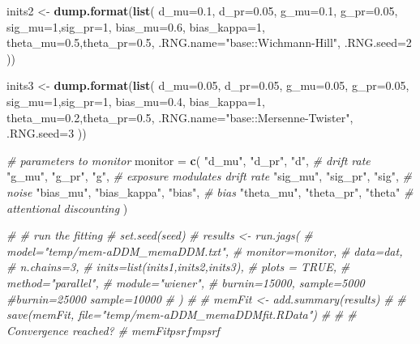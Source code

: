 \documentclass[
]{book}
\newenvironment{Shaded}{\begin{snugshade}}{\end{snugshade}}
\newcommand{\AttributeTok}[1]{\textcolor[rgb]{0.13,0.29,0.53}{#1}}
\newcommand{\CommentTok}[1]{\textcolor[rgb]{0.56,0.35,0.01}{\textit{#1}}}
\newcommand{\DecValTok}[1]{\textcolor[rgb]{0.00,0.00,0.81}{#1}}
\newcommand{\FloatTok}[1]{\textcolor[rgb]{0.00,0.00,0.81}{#1}}
\newcommand{\FunctionTok}[1]{\textcolor[rgb]{0.13,0.29,0.53}{\textbf{#1}}}
\newcommand{\NormalTok}[1]{#1}
\newcommand{\OtherTok}[1]{\textcolor[rgb]{0.56,0.35,0.01}{#1}}
\newcommand{\StringTok}[1]{\textcolor[rgb]{0.31,0.60,0.02}{#1}}
\begin{document}
\begin{Shaded}
\begin{Highlighting}[]
\NormalTok{inits2 }\OtherTok{\textless{}{-}} \FunctionTok{dump.format}\NormalTok{(}\FunctionTok{list}\NormalTok{( }
  \AttributeTok{d\_mu=}\FloatTok{0.1}\NormalTok{, }\AttributeTok{d\_pr=}\FloatTok{0.05}\NormalTok{,}
  \AttributeTok{g\_mu=}\FloatTok{0.1}\NormalTok{, }\AttributeTok{g\_pr=}\FloatTok{0.05}\NormalTok{,}
  \AttributeTok{sig\_mu=}\DecValTok{1}\NormalTok{,}\AttributeTok{sig\_pr=}\DecValTok{1}\NormalTok{,}
  \AttributeTok{bias\_mu=}\FloatTok{0.6}\NormalTok{, }\AttributeTok{bias\_kappa=}\DecValTok{1}\NormalTok{,}
  \AttributeTok{theta\_mu=}\FloatTok{0.5}\NormalTok{,}\AttributeTok{theta\_pr=}\FloatTok{0.5}\NormalTok{,}
  \AttributeTok{.RNG.name=}\StringTok{"base::Wichmann{-}Hill"}\NormalTok{, }\AttributeTok{.RNG.seed=}\DecValTok{2}
\NormalTok{))}

\NormalTok{inits3 }\OtherTok{\textless{}{-}} \FunctionTok{dump.format}\NormalTok{(}\FunctionTok{list}\NormalTok{( }
  \AttributeTok{d\_mu=}\FloatTok{0.05}\NormalTok{, }\AttributeTok{d\_pr=}\FloatTok{0.05}\NormalTok{,}
  \AttributeTok{g\_mu=}\FloatTok{0.05}\NormalTok{, }\AttributeTok{g\_pr=}\FloatTok{0.05}\NormalTok{,}
  \AttributeTok{sig\_mu=}\DecValTok{1}\NormalTok{,}\AttributeTok{sig\_pr=}\DecValTok{1}\NormalTok{,}
  \AttributeTok{bias\_mu=}\FloatTok{0.4}\NormalTok{, }\AttributeTok{bias\_kappa=}\DecValTok{1}\NormalTok{,}
  \AttributeTok{theta\_mu=}\FloatTok{0.2}\NormalTok{,}\AttributeTok{theta\_pr=}\FloatTok{0.5}\NormalTok{,}
  \AttributeTok{.RNG.name=}\StringTok{"base::Mersenne{-}Twister"}\NormalTok{, }\AttributeTok{.RNG.seed=}\DecValTok{3}
\NormalTok{))}

\CommentTok{\# parameters to monitor}
\NormalTok{monitor }\OtherTok{=} \FunctionTok{c}\NormalTok{(}
  \StringTok{"d\_mu"}\NormalTok{, }\StringTok{"d\_pr"}\NormalTok{, }\StringTok{"d"}\NormalTok{, }\CommentTok{\# drift rate}
  \StringTok{"g\_mu"}\NormalTok{, }\StringTok{"g\_pr"}\NormalTok{, }\StringTok{"g"}\NormalTok{, }\CommentTok{\# exposure modulates drift rate}
  \StringTok{"sig\_mu"}\NormalTok{, }\StringTok{"sig\_pr"}\NormalTok{, }\StringTok{"sig"}\NormalTok{, }\CommentTok{\# noise }
  \StringTok{"bias\_mu"}\NormalTok{, }\StringTok{"bias\_kappa"}\NormalTok{, }\StringTok{"bias"}\NormalTok{, }\CommentTok{\# bias}
  \StringTok{"theta\_mu"}\NormalTok{, }\StringTok{"theta\_pr"}\NormalTok{, }\StringTok{"theta"} \CommentTok{\# attentional discounting}
\NormalTok{) }

\CommentTok{\# \# run the fitting}
\CommentTok{\# set.seed(seed)}
\CommentTok{\# results \textless{}{-} run.jags(}
\CommentTok{\#   model="temp/mem{-}aDDM\_memaDDM.txt", }
\CommentTok{\#   monitor=monitor, }
\CommentTok{\#   data=dat, }
\CommentTok{\#   n.chains=3, }
\CommentTok{\#   inits=list(inits1,inits2,inits3),}
\CommentTok{\#   plots = TRUE, }
\CommentTok{\#   method="parallel", }
\CommentTok{\#   module="wiener", }
\CommentTok{\#   burnin=15000, sample=5000 \#burnin=25000 sample=10000}
\CommentTok{\# ) }
\CommentTok{\# }
\CommentTok{\# memFit \textless{}{-} add.summary(results)}
\CommentTok{\# }
\CommentTok{\# save(memFit, file="temp/mem{-}aDDM\_memaDDMfit.RData")}
\CommentTok{\# }
\CommentTok{\# \# Convergence reached?}
\CommentTok{\# memFit$psrf$mpsrf}
\end{Highlighting}
\end{Shaded}
\end{document}
